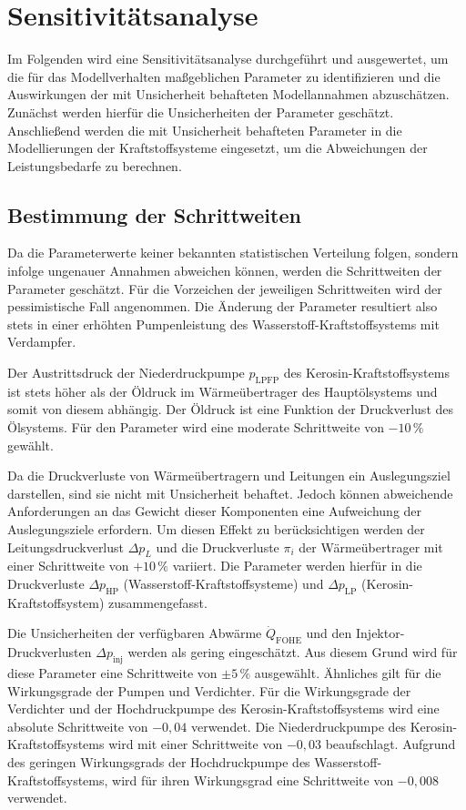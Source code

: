 \section{Sensitivitätsanalyse}

Im Folgenden wird eine Sensitivitätsanalyse durchgeführt und ausgewertet, um die für das Modellverhalten maßgeblichen Parameter zu identifizieren und die Auswirkungen der mit Unsicherheit behafteten Modellannahmen abzuschätzen. Zunächst werden hierfür die Unsicherheiten der Parameter geschätzt. Anschließend werden die mit Unsicherheit behafteten Parameter in die Modellierungen der Kraftstoffsysteme eingesetzt, um die Abweichungen der Leistungsbedarfe zu berechnen.

\subsection{Bestimmung der Schrittweiten}

Da die Parameterwerte keiner bekannten statistischen Verteilung folgen, sondern infolge ungenauer Annahmen abweichen können, werden die Schrittweiten der Parameter geschätzt. Für die Vorzeichen der jeweiligen Schrittweiten wird der pessimistische Fall angenommen. Die Änderung der Parameter resultiert also stets in einer erhöhten Pumpenleistung des Wasserstoff-Kraftstoffsystems mit Verdampfer.

Der Austrittsdruck der Niederdruckpumpe $p_\mathrm{LPFP}$ des Kerosin-Kraftstoffsystems ist stets höher als der Öldruck im Wärmeübertrager des Hauptölsystems und somit von diesem abhängig. Der Öldruck ist eine Funktion der Druckverlust des Ölsystems. Für den Parameter wird eine moderate Schrittweite von $-10\,\%$ gewählt.

Da die Druckverluste von Wärmeübertragern und Leitungen ein Auslegungsziel darstellen, sind sie nicht mit Unsicherheit behaftet. Jedoch können abweichende Anforderungen an das Gewicht dieser Komponenten eine Aufweichung der Auslegungsziele erfordern. Um diesen Effekt zu berücksichtigen werden der Leitungsdruckverlust $\Delta p_L$ und die Druckverluste $\pi_i$ der Wärmeübertrager mit einer Schrittweite von $+10\,\%$ variiert. Die Parameter werden hierfür in die Druckverluste $\Delta p_\mathrm{HP}$ (Wasserstoff-Kraftstoffsysteme) und $\Delta p_\mathrm{LP}$ (Kerosin-Kraftstoffsystem) zusammengefasst.

Die Unsicherheiten der verfügbaren Abwärme $\dot{Q}_\mathrm{FOHE}$ und den Injektor-Druckverlusten $\Delta p_\mathrm{inj}$ werden als gering eingeschätzt. Aus diesem Grund wird für diese Parameter eine Schrittweite von $\pm 5\,\%$ ausgewählt. Ähnliches gilt für die Wirkungsgrade der Pumpen und Verdichter. Für die Wirkungsgrade der Verdichter und der Hochdruckpumpe des Kerosin-Kraftstoffsystems wird eine absolute Schrittweite von $-0,04$ verwendet. Die Niederdruckpumpe des Kerosin-Kraftstoffsystems wird mit einer Schrittweite von $-0,03$ beaufschlagt. Aufgrund des geringen Wirkungsgrads der Hochdruckpumpe des Wasserstoff-Kraftstoffsystems, wird für ihren Wirkungsgrad eine Schrittweite von $-0,008$ verwendet.

